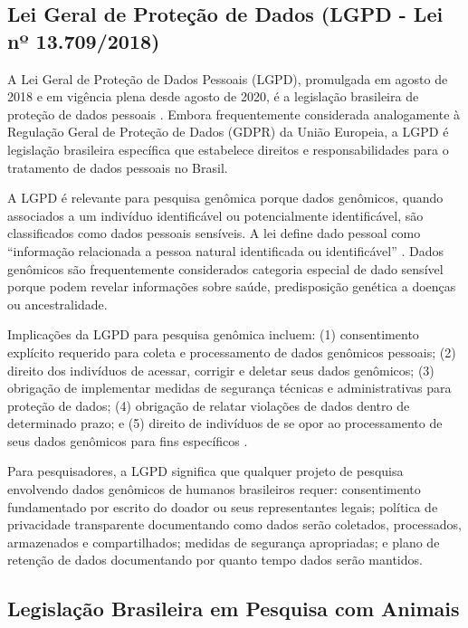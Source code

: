 \subsection{Lei Geral de Proteção de Dados (LGPD - Lei nº 13.709/2018)}

A Lei Geral de Proteção de Dados Pessoais (LGPD), promulgada em agosto de 2018 e em vigência plena desde agosto de 2020, é a legislação brasileira de proteção de dados pessoais \parencite{brasil2018lgpd}. Embora frequentemente considerada analogamente à Regulação Geral de Proteção de Dados (GDPR) da União Europeia, a LGPD é legislação brasileira específica que estabelece direitos e responsabilidades para o tratamento de dados pessoais no Brasil.

A LGPD é relevante para pesquisa genômica porque dados genômicos, quando associados a um indivíduo identificável ou potencialmente identificável, são classificados como dados pessoais sensíveis. A lei define dado pessoal como ``informação relacionada a pessoa natural identificada ou identificável'' \parencite{brasil2018lgpd}. Dados genômicos são frequentemente considerados categoria especial de dado sensível porque podem revelar informações sobre saúde, predisposição genética a doenças ou ancestralidade.

Implicações da LGPD para pesquisa genômica incluem: (1) consentimento explícito requerido para coleta e processamento de dados genômicos pessoais; (2) direito dos indivíduos de acessar, corrigir e deletar seus dados genômicos; (3) obrigação de implementar medidas de segurança técnicas e administrativas para proteção de dados; (4) obrigação de relatar violações de dados dentro de determinado prazo; e (5) direito de indivíduos de se opor ao processamento de seus dados genômicos para fins específicos \parencite{brasil2018lgpd}.

Para pesquisadores, a LGPD significa que qualquer projeto de pesquisa envolvendo dados genômicos de humanos brasileiros requer: consentimento fundamentado por escrito do doador ou seus representantes legais; política de privacidade transparente documentando como dados serão coletados, processados, armazenados e compartilhados; medidas de segurança apropriadas; e plano de retenção de dados documentando por quanto tempo dados serão mantidos.

\subsection{Legislação Brasileira em Pesquisa com Animais}

